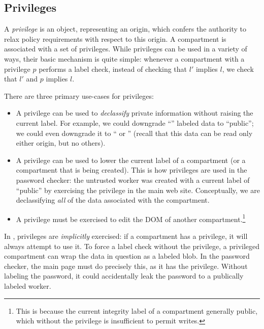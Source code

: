 \subsection{Privileges}
\label{sec:privileges}

A \emph{privilege} is an object, representing an origin, which confers
the authority to relax policy requirements with respect to this origin.
%
A compartment is associated with a set of privileges.
%
While privileges can be used in a variety of ways, their basic mechanism
is quite simple:  whenever a compartment with a privilege $p$ performs a
label check, instead of checking that $l'$ implies $l$, we check that
$l'$ and $p$ implies $l$.

There are three primary use-cases for privileges:

\begin{itemize}
    \item A privilege can be used to \emph{declassify} private
        information without raising the current label.  For example, we
        could downgrade ``'' labeled data to
        ``public''; we could even downgrade it to ``
        or '' (recall that this data can be read only
        either origin, but no others).

    \item A privilege can be used to lower the current label of
        a compartment (or a compartment that is being created).
        This is how privileges are used
        in the password checker: the untrusted worker was created
        with a current label of ``public'' by exercising the
         privilege in the main web site.  Conceptually, we
        are declassifying \emph{all} of the data associated with the
        compartment.

    \item A privilege must be exercised to edit the DOM
        of another compartment.\footnote{This is because the current
        integrity label of a compartment generally public, which
        without the privilege is insufficient to permit writes.}
\end{itemize}

In \sys{}, privileges are \emph{implicitly} exercised: if a compartment
has a privilege, it will always attempt to use it.  To force a label
check without the privilege, a privileged compartment can wrap the
data in question as a labeled blob.  In the password checker, the main
page must do precisely this, as it has the  privilege.
Without labeling the password, it could accidentally leak the password
to a publically labeled worker.

